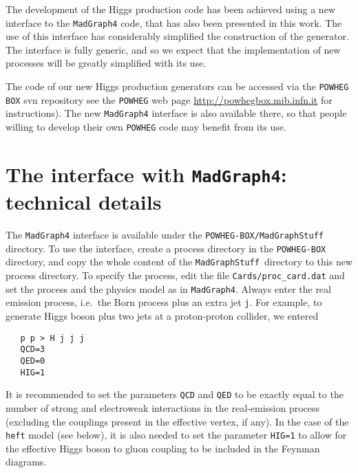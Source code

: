 \documentclass[paper]{JHEP3}
\newcommand\POWHEG{{\tt POWHEG}}
\newcommand\POWHEGBOX{{\tt POWHEG BOX}}
\newcommand\MG{{\tt MadGraph4}}
\newcommand\MGS{{\tt MadGraphStuff}}
\begin{document}
The development of the Higgs production code has been achieved using
a new interface to the \MG{} code, that has also been presented in this
work. The use of this interface has considerably simplified the
construction of the generator. The interface is fully generic,
and so we expect that the implementation of new processes will be greatly
simplified with its use.

The code of our new Higgs production generators can be accessed
via the \POWHEGBOX{} svn repository see the \POWHEG{} web page
\url{http://powhegbox.mib.infn.it}
for instructions). The new \MG{} interface is also available there,
so that people willing to develop their own \POWHEG{}
code may benefit from its use.





\appendix
\section{The interface with \MG: technical details}
\label{app:tech_details}
The \MG{} interface is available under the {\tt POWHEG-BOX/\MGS} directory.
To use the interface, create a process directory in the {\tt POWHEG-BOX}
directory, and copy the whole content of the \MGS\ directory to this new
process directory. To specify the process, edit the file
\verb|Cards/proc_card.dat| and set the process and the physics model as in
\MG. Always enter the real emission process, i.e.~the Born process plus an
extra jet \verb|j|. For example, to generate Higgs boson plus two jets at a
proton-proton collider, we entered
\begin{verbatim}
   p p > H j j j
   QCD=3
   QED=0
   HIG=1
\end{verbatim}
It is recommended to set the parameters \verb|QCD| and \verb|QED| to be
exactly equal to the number of strong and electroweak interactions in the
real-emission process (excluding the couplings present in the effective
vertex, if any). In the case of the \verb|heft| model (see below), it is also
needed to set the parameter \verb|HIG=1| to allow for the effective Higgs
boson to gluon coupling to be included in the Feynman diagrams.
\end{document}
